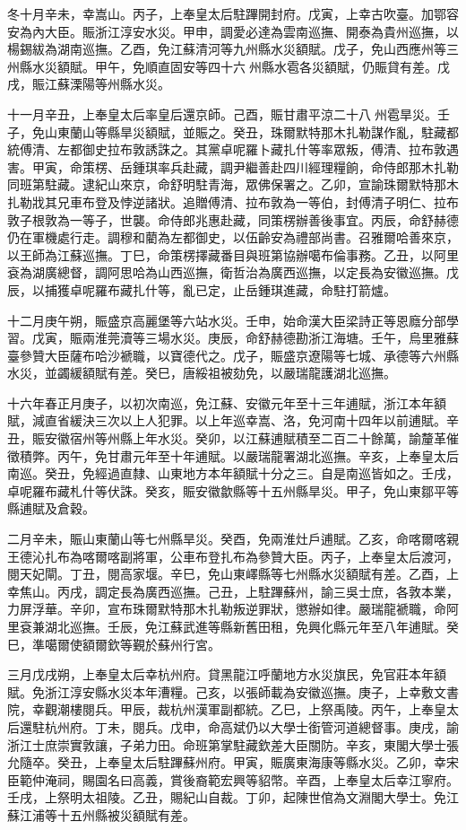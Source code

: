 \begin{pinyinscope}
冬十月辛未，幸嵩山。丙子，上奉皇太后駐蹕開封府。戊寅，上幸古吹臺。加鄂容安為內大臣。賑浙江淳安水災。甲申，調愛必達為雲南巡撫、開泰為貴州巡撫，以楊錫紱為湖南巡撫。乙酉，免江蘇清河等九州縣水災額賦。戊子，免山西應州等三州縣水災額賦。甲午，免順直固安等四十六州縣水雹各災額賦，仍賑貸有差。戊戌，賑江蘇溧陽等州縣水災。

十一月辛丑，上奉皇太后率皇后還京師。己酉，賑甘肅平涼二十八州雹旱災。壬子，免山東蘭山等縣旱災額賦，並賑之。癸丑，珠爾默特那木扎勒謀作亂，駐藏都統傅清、左都御史拉布敦誘誅之。其黨卓呢羅卜藏扎什等率眾叛，傅清、拉布敦遇害。甲寅，命策楞、岳鍾琪率兵赴藏，調尹繼善赴四川經理糧餉，命侍郎那木扎勒同班第駐藏。逮紀山來京，命舒明駐青海，眾佛保署之。乙卯，宣諭珠爾默特那木扎勒戕其兄車布登及悖逆諸狀。追贈傅清、拉布敦為一等伯，封傅清子明仁、拉布敦子根敦為一等子，世襲。命侍郎兆惠赴藏，同策楞辦善後事宜。丙辰，命舒赫德仍在軍機處行走。調穆和藺為左都御史，以伍齡安為禮部尚書。召雅爾哈善來京，以王師為江蘇巡撫。丁巳，命策楞擇藏番目與班第協辦噶布倫事務。乙丑，以阿里袞為湖廣總督，調阿思哈為山西巡撫，衛哲治為廣西巡撫，以定長為安徽巡撫。戊辰，以捕獲卓呢羅布藏扎什等，亂已定，止岳鍾琪進藏，命駐打箭爐。

十二月庚午朔，賑盛京高麗堡等六站水災。壬申，始命漢大臣梁詩正等恩廕分部學習。戊寅，賑兩淮莞瀆等三場水災。庚辰，命舒赫德勘浙江海塘。壬午，烏里雅蘇臺參贊大臣薩布哈沙褫職，以寶德代之。戊子，賑盛京遼陽等七城、承德等六州縣水災，並蠲緩額賦有差。癸巳，唐綏祖被劾免，以嚴瑞龍護湖北巡撫。

十六年春正月庚子，以初次南巡，免江蘇、安徽元年至十三年逋賦，浙江本年額賦，減直省緩決三次以上人犯罪。以上年巡幸嵩、洛，免河南十四年以前逋賦。辛丑，賑安徽宿州等州縣上年水災。癸卯，以江蘇逋賦積至二百二十餘萬，諭釐革催徵積弊。丙午，免甘肅元年至十年逋賦。以嚴瑞龍署湖北巡撫。辛亥，上奉皇太后南巡。癸丑，免經過直隸、山東地方本年額賦十分之三。自是南巡皆如之。壬戌，卓呢羅布藏札什等伏誅。癸亥，賑安徽歙縣等十五州縣旱災。甲子，免山東鄒平等縣逋賦及倉穀。

二月辛未，賑山東蘭山等七州縣旱災。癸酉，免兩淮灶戶逋賦。乙亥，命喀爾喀親王德沁扎布為喀爾喀副將軍，公車布登扎布為參贊大臣。丙子，上奉皇太后渡河，閱天妃閘。丁丑，閱高家堰。辛巳，免山東嶧縣等七州縣水災額賦有差。乙酉，上幸焦山。丙戌，調定長為廣西巡撫。己丑，上駐蹕蘇州，諭三吳士庶，各敦本業，力屏浮華。辛卯，宣布珠爾默特那木扎勒叛逆罪狀，懲辦如律。嚴瑞龍褫職，命阿里袞兼湖北巡撫。壬辰，免江蘇武進等縣新舊田租，免興化縣元年至八年逋賦。癸巳，準噶爾使額爾欽等覲於蘇州行宮。

三月戊戌朔，上奉皇太后幸杭州府。貸黑龍江呼蘭地方水災旗民，免官莊本年額賦。免浙江淳安縣水災本年漕糧。己亥，以張師載為安徽巡撫。庚子，上幸敷文書院，幸觀潮樓閱兵。甲辰，裁杭州漢軍副都統。乙巳，上祭禹陵。丙午，上奉皇太后還駐杭州府。丁未，閱兵。戊申，命高斌仍以大學士銜管河道總督事。庚戌，諭浙江士庶崇實敦讓，子弟力田。命班第掌駐藏欽差大臣關防。辛亥，東閣大學士張允隨卒。癸丑，上奉皇太后駐蹕蘇州府。甲寅，賑廣東海康等縣水災。乙卯，幸宋臣範仲淹祠，賜園名曰高義，賞後裔範宏興等貂幣。辛酉，上奉皇太后幸江寧府。壬戌，上祭明太祖陵。乙丑，賜紀山自裁。丁卯，起陳世倌為文淵閣大學士。免江蘇江浦等十五州縣被災額賦有差。


\end{pinyinscope}
